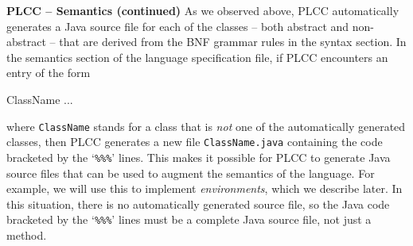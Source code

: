 \begin{minipage}[t]{\sw}
\slidenumber
\LARGE
{\bf PLCC -- Semantics (continued)}\exx
As we observed above,
PLCC automatically generates a Java source file for each of the classes --
both abstract and non-abstract --
that are derived from the BNF grammar rules in the syntax section.
In the semantics section of the language specification file,
if PLCC encounters an entry of the form
\begin{qv}
ClassName
...
\end{qv}
where \verb'ClassName' stands for a class that is {\em not} one
of the automatically generated classes,
then PLCC generates a new file \verb'ClassName.java'
containing the code bracketed by the `\verb'%%%'' lines.
This makes it possible for PLCC to generate Java source files
that can be used to augment the semantics of the language.
For example, we will use this to implement {\em environments},
which we describe later.\exx
In this situation, there is no automatically generated source file,
so the Java code bracketed by the `\verb'%%%'' lines
must be a complete Java source file, not just a method.
\end{minipage}
\clearpage
